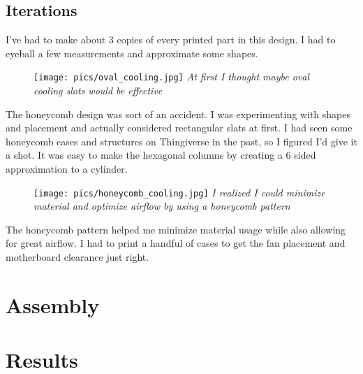 \documentclass{article}
\begin{document}
\subsection{Iterations}
I've had to make about 3 copies of every printed part in this design. I had to eyeball a few measurements and approximate some shapes. 
\begin{figure}[h]
\texttt{[image: pics/oval\_cooling.jpg]}
\emph{At first I thought maybe oval cooling slots would be effective}
\end{figure}
The honeycomb design was sort of an accident. I was experimenting with shapes and placement and actually considered rectangular slats at first. I had seen some honeycomb cases and structures on Thingiverse in the past, so I figured I'd give it a shot. It was easy to make the hexagonal columns by creating a 6 sided approximation to a cylinder.

\begin{figure}[h]
\texttt{[image: pics/honeycomb\_cooling.jpg]}
\emph{I realized I could minimize material and optimize airflow by using a honeycomb pattern}
\end{figure}
The honeycomb pattern helped me minimize material usage while also allowing for great airflow. I had to print a handful of cases to get the fan placement and motherboard clearance just right.

\section{Assembly}

\section{Results}
\end{document}
